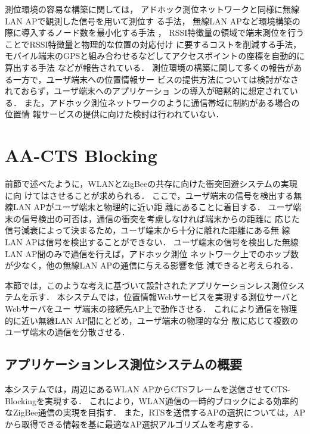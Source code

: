 \documentclass[technicalreport]{ieicej}
\begin{document}
測位環境の容易な構築に関しては，
アドホック測位ネットワークと同様に無線LAN APで観測した信号を用いて測位す
る手法\cite{ganu04:infra_loc_wlan}，
無線LAN APなど環境構築の際に導入するノード数を最小化する手法
\cite{krishnan04:lease}，
RSSI特徴量の領域で端末測位を行うことでRSSI特徴量と物理的な位置の対応付け
に要するコストを削減する手法\cite{yang12:locate_finger}，
モバイル端末のGPSと組み合わせるなどしてアクセスポイントの座標を自動的に
算出する手法
\cite{chintalapudi10:indoor_loc_nopain,lim10:zero-config_loc}
などが報告されている．
測位環境の構築に関して多くの報告がある一方で，ユーザ端末への位置情報サー
ビスの提供方法については検討がなされておらず，ユーザ端末へのアプリケーショ
ンの導入が暗黙的に想定されている．
また，アドホック測位ネットワークのように通信帯域に制約がある場合の位置情
報サービスの提供に向けた検討は行われていない．

\section{AA-CTS Blocking}
\label{sec:aa_cts}

前節で述べたように，WLANとZigBeeの共存に向けた衝突回避システムの実現に向
けてはさせることが求められる．
ここで，ユーザ端末の信号を検出する無線LAN APがユーザ端末と物理的に近い距
離にあることに着目する．
ユーザ端末の信号検出の可否は，通信の衝突を考慮しなければ端末からの距離に
応じた信号減衰によって決まるため，ユーザ端末から十分に離れた距離にある無
線LAN APは信号を検出することができない．
ユーザ端末の信号を検出した無線LAN AP間のみで通信を行えば，アドホック測位
ネットワーク上でのホップ数が少なく，他の無線LAN APの通信に与える影響を低
減できると考えられる．

本節では，このような考えに基づいて設計されたアプリケーションレス測位シス
テムを示す．
本システムでは，位置情報Webサービスを実現する測位サーバとWebサーバをユー
ザ端末の接続先AP上で動作させる．
これにより通信を物理的に近い無線LAN AP間にとどめ，ユーザ端末の物理的な分
散に応じて複数のユーザ端末の通信を分散させる．

\subsection{アプリケーションレス測位システムの概要}

本システムでは，周辺にあるWLAN APからCTSフレームを送信させてCTS-Blockingを実現する．
これにより，WLAN通信の一時的ブロックによる効率的なZigBee通信の実現を目指す．
また，RTSを送信するAPの選択については，APから取得できる情報を基に最適なAP選択アルゴリズムを考慮する．
\end{document}

